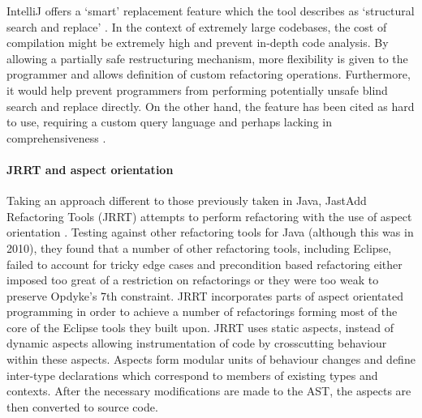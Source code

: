 IntelliJ offers a `smart' replacement feature which the tool describes as `structural search and replace' \cite{jemerov2008implementing}. In the context of extremely large codebases, the cost of compilation might be extremely high and prevent in-depth code analysis. By allowing a partially safe restructuring mechanism, more flexibility is given to the programmer and allows definition of custom refactoring operations. Furthermore, it would help prevent programmers from performing potentially unsafe blind search and replace directly. On the other hand, the feature has been cited as hard to use, requiring a custom query language and perhaps lacking in comprehensiveness \cite{jemerov2008implementing}.

\paragraph{JRRT and aspect orientation}
Taking an approach different to those previously taken in Java, JastAdd Refactoring Tools (JRRT) attempts to perform refactoring with the use of aspect orientation \cite{schafer2010specification}. Testing against other refactoring tools for Java (although this was in 2010), they found that a number of other refactoring tools, including Eclipse, failed to account for tricky edge cases and precondition based refactoring either imposed too great of a restriction on refactorings or they were too weak to preserve Opdyke's 7th constraint. JRRT incorporates parts of aspect orientated programming in order to achieve a number of refactorings forming most of the core of the Eclipse tools they built upon. JRRT uses static aspects, instead of dynamic aspects allowing instrumentation of code by crosscutting behaviour within these aspects. Aspects form modular units of behaviour changes and define inter-type declarations which correspond to members of existing types and contexts. After the necessary modifications are made to the AST, the aspects are then converted to source code.

